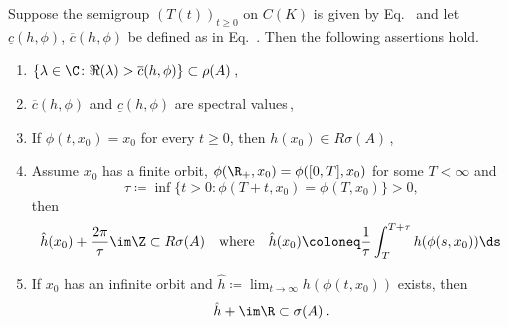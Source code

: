 \begin{proposition}\label{prop:b3-4.8}
Suppose the semigroup $(T(t))_{t\geq 0}$ on $C(K)$ is given by 
Eq.~ and let $\underline{c}(h,\phi)$, $\overline{c}(h,\phi)$ be defined as in Eq.~.
Then the following assertions hold.
\begin{enumerate}[\upshape (i)]
\item 
	$\{\lambda \in \C \colon \Re(\lambda) > \overline{c}(h,\phi)\} \subset \rho(A)$\,,
		
\item 
	$\overline{c}(h,\phi)$ and $\underline{c}(h,\phi)$ are spectral values\,,
		
\item 
	If\/ $\phi(t,x_{0}) = x_{0}$ for every $t \geq 0$, then $h(x_{0}) \in R{\sigma}(A)$\,,
		
\item 
Assume $x_{0}$ has a finite orbit, \ie $\phi(\R_{+},x_{0}) = \phi([0,T],x_{0})$ for some $T < \infty$ and 
\[
\tau \coloneq \inf\{t > 0 \colon \phi(T+t,x_{0}) = \phi(T,x_{0})\} > 0, 
\]
then 
\[
\hat{h}(x_{0}) + \frac{2\pi}{\tau}\im\Z \subset R{\sigma}(A)\quad\text{where}\quad \hat{h}(x_{0}) \coloneq \frac{1}{\tau}\int_{T}^{T+\tau}h(\phi(s,x_{0}))\ds\,
\]
		
\item 
	If\/ $x_{0}$ has an infinite orbit and 
	$\hat{h} \coloneq  \lim_{t\to\infty}h(\phi(t,x_{0}))$ exists, then 
    \[
    \hat{h} + \im\R \subset \sigma(A)\,.
    \]
\end{enumerate}
\end{proposition}
